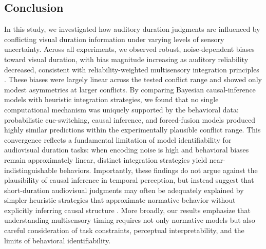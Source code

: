 \documentclass[9pt,lineno,doublespacing]{elife}
\begin{document}


\subsection{Conclusion}

In this study, we investigated how auditory duration judgments are influenced by conflicting visual duration information under varying levels of sensory uncertainty. Across all experiments, we observed robust, noise-dependent biases toward visual duration, with bias magnitude increasing as auditory reliability decreased, consistent with reliability-weighted multisensory integration principles \citep{ernst2002humans,van2008distortions,hartcher2014duration}. These biases were largely linear across the tested conflict range and showed only modest asymmetries at larger conflicts. By comparing Bayesian causal-inference models with heuristic integration strategies, we found that no single computational mechanism was uniquely supported by the behavioral data: probabilistic cue-switching, causal inference, and forced-fusion models produced highly similar predictions within the experimentally plausible conflict range. This convergence reflects a fundamental limitation of model identifiability for audiovisual duration tasks: when encoding noise is high and behavioral biases remain approximately linear, distinct integration strategies yield near-indistinguishable behaviors. Importantly, these findings do not argue against the plausibility of causal inference in temporal perception, but instead suggest that short-duration audiovisual judgments may often be adequately explained by simpler heuristic strategies that approximate normative behavior without explicitly inferring causal structure \citep{caruso2018single,laquitaine2018switching,ni2024computational}. More broadly, our results emphasize that understanding multisensory timing requires not only normative models but also careful consideration of task constraints, perceptual interpretability, and the limits of behavioral identifiability.
\end{document}
